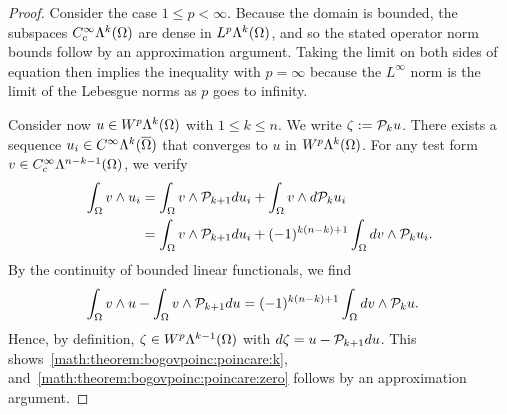 \documentclass[10pt,a4paper]{article}
\begin{document}
\begin{proof}
    Consider the case $1 \leq p < \infty$.
    Because the domain is bounded, 
    the subspaces $C^{\infty}_{c}\Lambda^{k}(\Omega)$ are dense in $L^{p}\Lambda^{k}(\Omega)$,
    and so the stated operator norm bounds follow by an approximation argument. 
    Taking the limit on both sides of equation then implies the inequality with $p = \infty$
    because the $L^{\infty}$ norm is the limit of the Lebesgue norms as $p$ goes to infinity. 
    
    
    Consider now $u \in W^{p}\Lambda^{k}(\Omega)$ with $1 \leq k \leq n$. 
    We write $\zeta := {\mathcal P}_{k  } u$. 
    There exists a sequence $u_{i} \in C^{\infty}\Lambda^{k}(\overline\Omega)$ that converges to $u$ in $W^{p}\Lambda^{k}(\Omega)$. 
    For any test form $v \in C^{\infty}_{c}\Lambda^{n-k-1}(\Omega)$, we verify 
    \begin{align*}
        \int_{\Omega} v \wedge u_{i} 
        &=
        \int_{\Omega} v \wedge {\mathcal P}_{k+1} d u_{i}
        +
        \int_{\Omega} v \wedge d {\mathcal P}_{k  } u_{i}
        \\&=
        \int_{\Omega} v \wedge {\mathcal P}_{k+1} d u_{i}
        +
        (-1)^{k(n-k)+1}
        \int_{\Omega} d v \wedge {\mathcal P}_{k  } u_{i}
        .
    \end{align*}
    By the continuity of bounded linear functionals, we find 
    \begin{align*}
        \int_{\Omega} v \wedge u 
        -
        \int_{\Omega} v \wedge {\mathcal P}_{k+1} d u 
        &=
        (-1)^{k(n-k)+1}
        \int_{\Omega} d v \wedge {\mathcal P}_{k  } u 
        .
    \end{align*}
    Hence, by definition, $\zeta \in W^{p}\Lambda^{k-1}(\Omega)$ with $d \zeta = u - {\mathcal P}_{k+1} d u$.
    This shows~\eqref{math:theorem:bogovpoinc:poincare:k}, and~\eqref{math:theorem:bogovpoinc:poincare:zero} follows by an approximation argument.
    
    
    

\end{proof}
\end{document}
